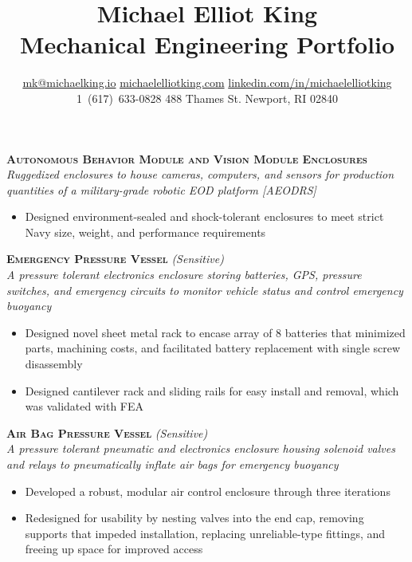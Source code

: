 \documentclass[12pt, landscape]{article}
\title{{\Huge Michael Elliot King}\\[10pt]
Mechanical Engineering Portfolio\\[3in]}
\author{\small
\Letter \hspace{3pt} \href{mailto:mk@mmichaelking.io}{mk@michaelking.io} \hspace{1pt}
\Mundus \hspace{3pt} \href{http://www.michaelelliotking.com}{michaelelliotking.com}
\linkedin \hspace{1pt} \href{http://www.linkedin.com/in/michaelelliotking}{linkedin.com/in/michaelelliotking}\\
\small \Telefon \hspace{1pt} 1~(617)~633-0828 \hspace{1pt}
\textifsymbol{23} \hspace{1pt} 488 Thames St. Newport, RI 02840
 }
\date{}
\begin{document}
\begin{titlepage}
\linespread{1}\maketitle
\thispagestyle{empty}
\end{titlepage}


\pagestyle{fancy}

\begin{samepage}
    \textbf{\scshape Autonomous Behavior Module and Vision Module Enclosures}\\
    \textit{Ruggedized enclosures to house cameras, computers, and sensors for production quantities of a military-grade robotic EOD platform [AEODRS]}
    \begin{itemize}      
      \item Designed environment-sealed and shock-tolerant enclosures to meet strict Navy size, weight, and performance requirements
    \end{itemize}
  \end{samepage}

\begin{samepage}
    \textbf{\scshape Emergency Pressure Vessel} \textit{(Sensitive)}\\
    \textit{A pressure tolerant electronics enclosure storing batteries, GPS, pressure switches, and emergency circuits to monitor vehicle status and control emergency buoyancy}
    \begin{itemize}      
      \item Designed novel sheet metal rack to encase array of 8 batteries that minimized parts, machining costs, and facilitated battery replacement with single screw disassembly
      \item Designed cantilever rack and sliding rails for easy install and removal, which was validated with FEA
    \end{itemize}
  \end{samepage}

  \begin{samepage}
    \textbf{\scshape Air Bag Pressure Vessel} \textit{(Sensitive)}\\
    \textit{A pressure tolerant pneumatic and electronics enclosure housing solenoid valves and relays to pneumatically inflate air bags for emergency buoyancy}
    \begin{itemize}      
      \item Developed a robust, modular air control enclosure through three iterations
      \item Redesigned for usability by nesting valves into the end cap, removing supports that impeded installation, replacing unreliable-type fittings, and freeing up space for improved access
    \end{itemize}
  \end{samepage}
\end{document}
